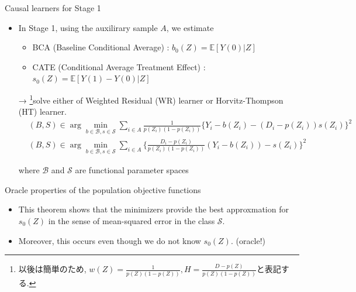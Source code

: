 \documentclass[xcolor=svgnames,aspectratio=169]{beamer}
\newcommand{\E}{\mathbb{E}}
\begin{document}
\begin{frame}{Causal learners for Stage 1}
    \begin{itemize}
        \item In Stage 1, using the auxilirary sample $A$, we estimate 
        \begin{itemize}
            \item BCA (Baseline Conditional Average) : $b_0(Z)=\E[Y(0)|Z]$
            \item CATE (Conditional Average Treatment Effect) : $s_0(Z)=\E[Y(1)-Y(0)|Z]$
        \end{itemize}
        → \footnote{以後は簡単のため, $w(Z)=\frac{1}{p(Z)(1-p(Z))},H=\frac{D-p(Z)}{p(Z)(1-p(Z))}$と表記する.}solve \alert{either} of Weighted Residual (WR) learner or Horvitz-Thompson (HT) learner.
        \begin{align*}
            &(B,S)\in \arg\min_{b\in\mathcal{B} , s\in\mathcal{S} }\sum_{i\in A} \frac{1}{p(Z_i)(1-p(Z_i))}\{Y_i-b(Z_i)-(D_i-p(Z_i))s(Z_i)\}^2 \\
            &(B,S)\in \arg\min_{b\in\mathcal{B} , s\in\mathcal{S} }\sum_{i\in A} \{\frac{D_i-p(Z_i)}{p(Z_i)(1-p(Z_i))}(Y_i-b(Z_i))-s(Z_i)\}^2 
        \end{align*}
        \begin{center}
            where $\mathcal{B}$ and $\mathcal{S}$ are functional parameter spaces
        \end{center}
    \end{itemize}
\end{frame}

\begin{frame}{Oracle properties of the population objective functions}
    \begin{itemize}
        \begin{tcolorbox}[colframe=Cyan,title=Theorem 4]
        \begin{itemize}
            \item Suppose $Y, b(Z), s(Z), w(Z) \in L^2$ (2乗可積分).
            \item Then, the expectation of the loss functions can be decomposed 
            \begin{align*}
                &\E[w(Z)\{Y-b(Z)-(D-p(Z))s(Z)\}^2]=\E[(s_0(Z)-s(Z))^2]+C_{ib} \\
                &\E[(H(Y-b(Z)-s(Z)))^2]=\E[(s_0(Z)-s(Z))^2]+C_{2b}
            \end{align*}
            where $C_{1b}=\E[w(Z)(\tilde{b}_0(Z)-b(Z))^2]+C_1, C_{1b}=\E[w(Z)(\bar{b}_0(Z)-b(Z))^2]+C_2$
        \end{itemize}
    \end{tcolorbox}
    \item This theorem shows that the minimizers provide the best approxmation for $s_0(Z)$ in the sense of mean-squared error in the class $\mathcal{S} $.
    \item Moreover, this occurs even though we do not know $s_0(Z)$. (oracle!)
    \end{itemize}
\end{frame}
\end{document}
